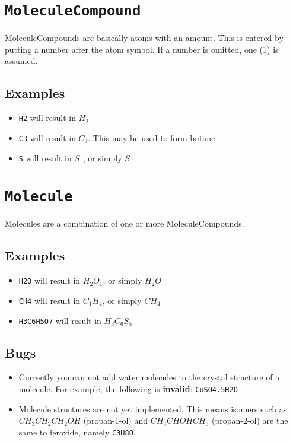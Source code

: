 \documentclass[11pt]{article}
\def\code#1{\texttt{#1}}
\begin{document}
\section{\code{MoleculeCompound}}
MoleculeCompounds are basically atoms with an amount. This is entered by
putting a number after the atom symbol. If a number is omitted, one (1) is assumed.

\subsection{Examples}
\begin{itemize}
  \item{\code{H2} will result in $H_2$}
  \item{\code{C3} will result in $C_3$. This may be used to form butane}
  \item{\code{S} will result in $S_1$, or simply $S$}
\end{itemize}


\section{\code{Molecule}}
Molecules are a combination of one or more MoleculeCompounds.

\subsection{Examples}
\begin{itemize}
  \item{\code{H2O} will result in $H_2O_1$, or simply $H_2O$}
  \item{\code{CH4} will result in $C_1H_4$, or simply $CH_4$}
  \item{\code{H3C6H5O7} will result in $H_3C_6S_5$}
\end{itemize}

\subsection{Bugs}
\begin{itemize}
\item{Currently you can not add water molecules to the crystal structure of a molecule. For example, the following is \textbf{invalid}: \code{CuSO4.5H2O}}
\item{Molecule structures are not yet implemented. This means isomers such as $CH_3CH_2CH_2OH$ (propan-1-ol) and $CH_3CHOHCH_3$ (propan-2-ol) are the same to feroxide, namely \code{C3H8O}.}
\end{itemize}
\end{document}
